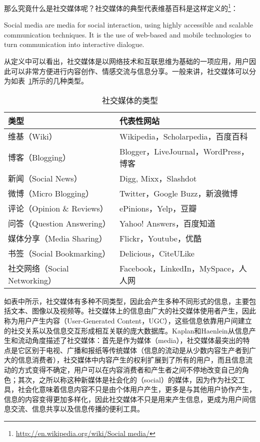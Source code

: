 那么究竟什么是社交媒体呢？社交媒体的典型代表维基百科是这样定义的\footnote{\url{http://en.wikipedia.org/wiki/Social media/}}：

\begin{definition}
Social media are media for social interaction, using highly accessible and scalable communication techniques. It is the use of web-based and mobile technologies to turn communication into interactive dialogue.
\end{definition}

从定义中可以看出，社交媒体是以网络技术和互联思维为基础的一项应用，用户因此可以非常方便进行内容创作、情感交流与信息分享。一般来讲，社交媒体可以分为如表~\ref{tab1-2}所示的几种类型。

\begin{table}[htp]
\centering
\caption{社交媒体的类型}
\label{tab1-2}
 \begin{tabular}{|l|l|}
 \hline
 类型& 代表性网站\\
 \hline
 维基（Wiki） & Wikipedia，Scholarpedia，百度百科\\
 \hline
 博客（Blogging） & Blogger，LiveJournal，WordPress，博客\\
 \hline
 新闻（Social News） & Digg, Mixx，Slashdot\\
 \hline
 微博（Micro Blogging） & Twitter，Google Buzz，新浪微博\\
 \hline
 评论（Opinion \& Reviews） & ePinions，Yelp，豆瓣\\
 \hline
 问答（Question Answering） & Yahoo! Answers，百度知道\\
 \hline
 媒体分享（Media Sharing） & Flickr，Youtube，优酷\\
 \hline
 书签（Social Bookmarking） & Delicious，CiteULike\\
 \hline
 社交网络（Social Networking） & Facebook，LinkedIn，MySpace，人人网\\
 \hline
\end{tabular}
\end{table}

如表中所示，社交媒体有多种不同类型，因此会产生多种不同形式的信息，主要包括文本、图像以及视频等。社交媒体上的信息由广大的社交媒体使用者产生，因此称为用户产生内容（User-Generated Content，UGC），这些信息依靠用户间建立的社交关系以及信息交互形成相互关联的庞大数据库。Kaplan和Haenlein从信息产生和流动角度描述了社交媒体：首先是作为媒体（media），社交媒体最突出的特点是它区别于电视、广播和报纸等传统媒体（信息的流动是从少数内容生产者到广大的信息消费者），社交媒体中内容产生的权利扩展到了所有的用户，而且信息流动的方式变得不确定，用户可以在内容消费者和产生者之间不停地改变自己的角色；其次，之所以称这种新媒体是社会化的（social）的媒体，因为作为社交工具，社会化意味着信息内容不只是由个体用户产生，更多是与其他用户协作产生，信息的内容变得更加多样化，因此社交媒体不只是用来产生信息，更成为用户间信息交流、信息共享以及信息传播的便利工具。

